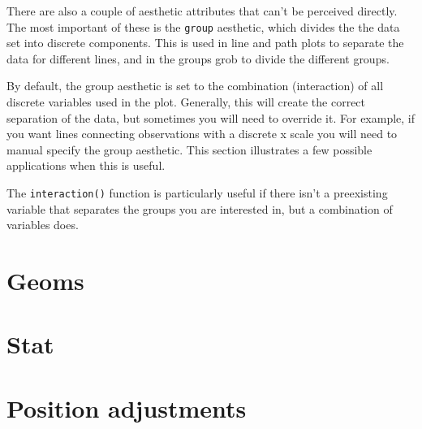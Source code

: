 There are also a couple of aesthetic attributes that can't be perceived directly.  The most important of these is the {\tt group} aesthetic, which divides the the data set into discrete components.   This is used in line and path plots to separate the data for different lines, and in the groups grob to divide the different groups. 

By default, the group aesthetic is set to the combination (interaction) of all discrete variables used in the plot.  Generally, this will create the correct separation of the data, but sometimes you will need to override it.  For example, if you want lines connecting observations with a discrete x scale you will need to manual specify the group aesthetic.  This section illustrates a few possible applications when this is useful.

The {\tt interaction()} function is particularly useful if there isn't a preexisting variable that separates the groups you are interested in, but a combination of variables does.  

\section{Geoms}
\label{sec:geoms}

\section{Stat}
\label{sec:stat}

\section{Position adjustments}
\label{sec:position}





